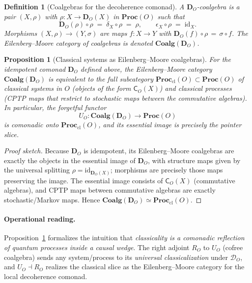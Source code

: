 \documentclass[11pt]{article}
\theoremstyle{upright}
\newtheorem{proposition}{Proposition}
\newtheorem{definition}{Definition}
\begin{document}
\begin{definition}[Coalgebras for the decoherence comonad]
A \emph{$\mathbf{D}_O$-coalgebra} is a pair $(X,\rho)$ with $\rho:X\to \mathbf{D}_O(X)$ in $\mathbf{Proc}(O)$ such that
\[
\mathbf{D}_O(\rho)\circ \rho \;=\; \delta_X\circ \rho \;=\; \rho,
\qquad
\epsilon_X\circ \rho \;=\; \mathrm{id}_X.
\]
Morphisms $(X,\rho)\to (Y,\sigma)$ are maps $f:X\to Y$ with $\mathbf{D}_O(f)\circ \rho \,=\, \sigma\circ f$. The Eilenberg--Moore category of coalgebras is denoted $\mathbf{Coalg}(\mathbf{D}_O)$.
\end{definition}

\begin{proposition}[Classical systems as Eilenberg--Moore coalgebras]
\label{prop:EM-classical}
For the idempotent comonad $\mathbf{D}_O$ defined above, the Eilenberg--Moore category $\mathbf{Coalg}(\mathbf{D}_O)$ is equivalent to the full subcategory $\mathbf{Proc}_{\mathrm{cl}}(O)\subset \mathbf{Proc}(O)$ of \emph{classical systems in $O$} (objects of the form $\mathsf{C}_O(X)$) and \emph{classical processes} (CPTP maps that restrict to stochastic maps between the commutative algebras). In particular, the forgetful functor
\[
U_O:\mathbf{Coalg}(\mathbf{D}_O)\longrightarrow \mathbf{Proc}(O)
\]
is comonadic onto $\mathbf{Proc}_{\mathrm{cl}}(O)$, and its essential image is precisely the pointer slice.
\end{proposition}

\begin{proof}[Proof sketch]
Because $\mathbf{D}_O$ is idempotent, its Eilenberg--Moore coalgebras are exactly the objects in the essential image of $\mathbf{D}_O$, with structure maps given by the universal splitting $\rho=\mathrm{id}_{\mathbf{D}_O(X)}$; morphisms are precisely those maps preserving the image. The essential image consists of $\mathsf{C}_O(X)$ (commutative algebras), and CPTP maps between commutative algebras are exactly stochastic/Markov maps. Hence $\mathbf{Coalg}(\mathbf{D}_O)\simeq \mathbf{Proc}_{\mathrm{cl}}(O)$.
\end{proof}

\paragraph{Operational reading.}
Proposition~\ref{prop:EM-classical} formalizes the intuition that \emph{classicality is a comonadic reflection of quantum processes inside a causal wedge}. The right adjoint $R_O$ to $U_O$ (cofree coalgebra) sends any system/process to its \emph{universal classicalization} under $\mathcal{D}_O$, and $U_O\dashv R_O$ realizes the classical slice as the Eilenberg--Moore category for the local decoherence comonad.
\end{document}
